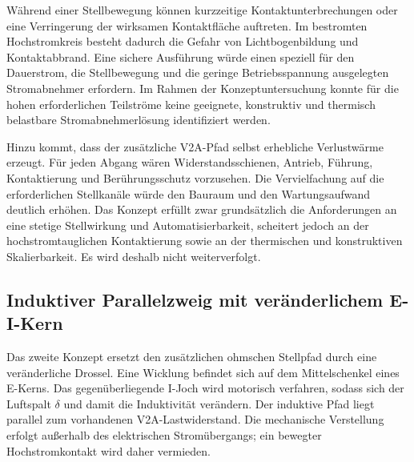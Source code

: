 Während einer Stellbewegung können kurzzeitige Kontakt\-unterbrechungen oder
eine Verringerung der wirksamen Kontaktfläche auftreten. Im bestromten
Hochstrom\-kreis besteht dadurch die Gefahr von Lichtbogen\-bildung und
Kontaktabbrand. Eine sichere Ausführung würde einen speziell für den
Dauerstrom, die Stellbewegung und die geringe Betriebsspannung ausgelegten
Stromabnehmer erfordern. Im Rahmen der Konzeptuntersuchung konnte für die
hohen erforderlichen Teilströme keine geeignete, konstruktiv und thermisch
belastbare Stromabnehmer\-lösung identifiziert werden.

Hinzu kommt, dass der zusätzliche V2A-Pfad selbst erhebliche Verlustwärme
erzeugt. Für jeden Abgang wären Widerstandsschienen, Antrieb, Führung,
Kontaktierung und Berührungsschutz vorzusehen. Die Vervielfachung auf die
erforderlichen Stellkanäle würde den Bauraum und den Wartungsaufwand deutlich
erhöhen. Das Konzept erfüllt zwar grundsätzlich die Anforderungen an eine
stetige Stellwirkung und Automatisierbarkeit, scheitert jedoch an der
hochstromtauglichen Kontaktierung sowie an der thermischen und konstruktiven
Skalierbarkeit. Es wird deshalb nicht weiterverfolgt.


\subsection{Induktiver Parallelzweig mit veränderlichem E-I-Kern}
\label{sec:konzept_ei_kern}

Das zweite Konzept ersetzt den zusätzlichen ohmschen Stellpfad durch eine
veränderliche Drossel. Eine Wicklung befindet sich auf dem Mittelschenkel
eines E-Kerns. Das gegenüberliegende I-Joch wird motorisch verfahren, sodass
sich der Luftspalt $\delta$ und damit die Induktivität verändern. Der
induktive Pfad liegt parallel zum vorhandenen V2A-Lastwiderstand. Die
mechanische Verstellung erfolgt außerhalb des elektrischen Stromübergangs;
ein bewegter Hochstromkontakt wird daher vermieden.


